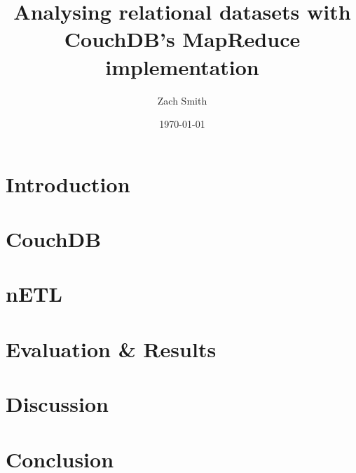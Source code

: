 \documentclass[
    parskip=full,
    a4paper
]{scrartcl}
\title{Analysing relational datasets with CouchDB's MapReduce implementation}
\author{Zach Smith}
\date{\today}
\begin{document}
\maketitle
\newpage

\tableofcontents
\newpage

\section{Introduction}




\section{CouchDB}



\section{nETL}





\section{Evaluation \& Results}
\section{Discussion}

\section{Conclusion}

\newpage

\begin{appendix}
    
    
    \listoffigures
    \listoftables
\end{appendix}
\newpage




\end{document}
